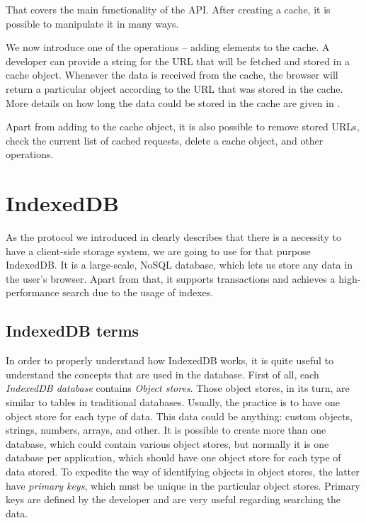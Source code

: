 That covers the main functionality of the API. After creating a cache, it is possible to manipulate it in many ways. 

We now introduce one of the operations -- adding elements to the cache. A developer can provide a string for the URL that will be fetched and stored in a cache object. Whenever the data is received from the cache, the browser will return a particular object according to the URL that was stored in the cache. More details on how long the data could be stored in the cache are given in .

Apart from adding to the cache object, it is also possible to remove stored URLs, check the current list of cached requests, delete a cache object, and other operations. 

\section{IndexedDB}
\label{IndexedDB}

As the protocol we introduced in  clearly describes that there is a necessity to have a client-side storage system, we are going to use for that purpose IndexedDB\cite{35}. It is a large-scale, NoSQL database, which lets us store any data in the user's browser. Apart from that, it supports transactions and achieves a high-performance search due to the usage of indexes. 

\subsection{IndexedDB terms}

In order to properly understand how IndexedDB works, it is quite useful to understand the concepts that are used in the database. First of all, each \textit{IndexedDB database} contains \textit{Object stores}. Those object stores, in its turn, are similar to tables in traditional databases. Usually, the practice is to have one object store for each type of data. This data could be anything: custom objects, strings, numbers, arrays, and other. It is possible to create more than one database, which could contain various object stores, but normally it is one database per application, which should have one object store for each type of data stored. To expedite the way of identifying objects in object stores, the latter have \textit{primary keys}, which must be unique in the particular object stores. Primary keys are defined by the developer and are very useful regarding searching the data.

